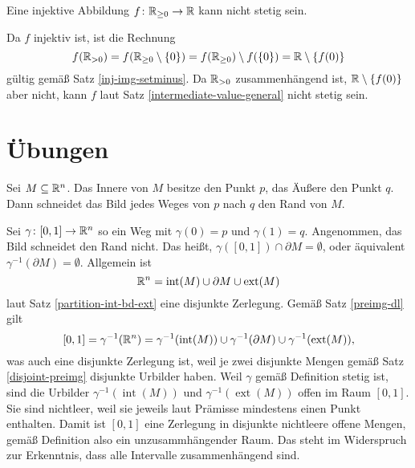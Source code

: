 \begin{Satz}
Eine injektive Abbildung $f\colon\mathbb R_{\ge 0}\to\mathbb R$ kann nicht stetig sein.
\end{Satz}
\begin{Beweis}
Da $f$ injektiv ist, ist die Rechnung
\[f(\mathbb R_{>0}) = f(\mathbb R_{\ge 0}\setminus\{0\})
= f(\mathbb R_{\ge 0})\setminus f(\{0\}) = \mathbb R\setminus\{f(0)\}\]
gültig gemäß Satz \ref{inj-img-setminus}. Da $\mathbb R_{>0}$ zusammenhängend
ist, $\mathbb R\setminus\{f(0)\}$ aber nicht, kann $f$ laut Satz
\ref{intermediate-value-general} nicht stetig sein.\,\qedsymbol
\end{Beweis}

\section{Übungen}

\begin{Satz}
Sei $M\subseteq\mathbb R^n$. Das Innere von $M$ besitze den Punkt $p$,
das Äußere den Punkt $q$. Dann schneidet das Bild jedes Weges von $p$
nach $q$ den Rand von $M$.
\end{Satz}
\begin{Beweis}[Beweis 1]
Sei $\gamma\colon [0,1]\to\mathbb R^n$ so ein Weg mit
$\gamma(0)=p$ und $\gamma(1)=q$. Angenommen, das Bild schneidet
den Rand nicht. Das heißt, $\gamma([0,1])\cap\partial M = \emptyset$,
oder äquivalent $\gamma^{-1}(\partial M)=\emptyset$.
Allgemein ist
\[\mathbb R^n = \operatorname{int}(M) \cup \partial M \cup \operatorname{ext}(M)\]
laut Satz \ref{partition-int-bd-ext} eine disjunkte Zerlegung.
Gemäß Satz \ref{preimg-dl} gilt
\[[0,1] = \gamma^{-1}(\mathbb R^n) = \gamma^{-1}(\operatorname{int}(M))
\cup \gamma^{-1}(\partial M)\cup \gamma^{-1}(\operatorname{ext}(M)),\]
was auch eine disjunkte Zerlegung ist, weil je zwei disjunkte Mengen
gemäß Satz \ref{disjoint-preimg} disjunkte Urbilder haben.
Weil $\gamma$ gemäß Definition stetig ist,
sind die Urbilder $\gamma^{-1}(\operatorname{int}(M))$ und
$\gamma^{-1}(\operatorname{ext}(M))$ offen im Raum $[0,1]$. Sie sind
nichtleer, weil sie jeweils laut Prämisse mindestens einen Punkt
enthalten. Damit ist $[0,1]$ eine Zerlegung in disjunkte nichtleere
offene Mengen, gemäß Definition also ein unzusammhängender Raum. Das
steht im Widerspruch zur Erkenntnis, dass alle Intervalle
zusammenhängend sind.\,\qedsymbol
\end{Beweis}

